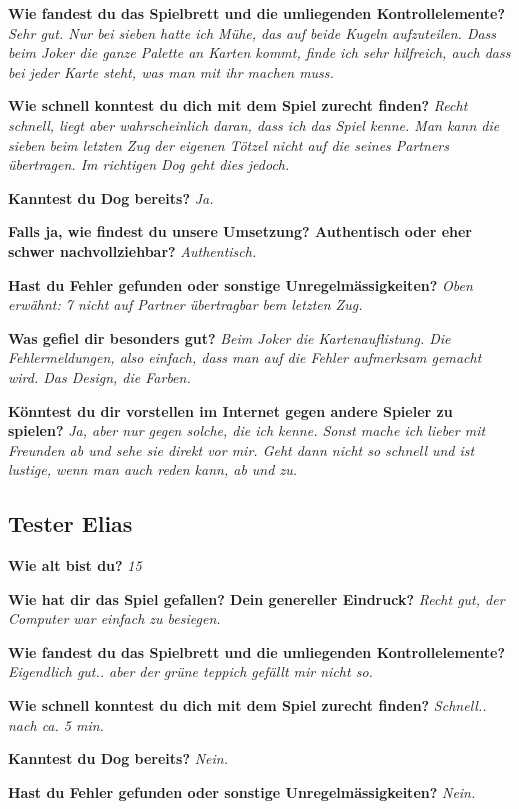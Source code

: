 \documentclass[12pt,halfparskip]{scrartcl}
\begin{document}
\textbf{Wie fandest du das Spielbrett und die umliegenden Kontrollelemente?}
\emph{Sehr gut. Nur bei sieben hatte ich Mühe, das auf beide Kugeln aufzuteilen. Dass beim Joker die ganze Palette an Karten kommt, finde ich sehr hilfreich, auch dass bei jeder Karte steht, was man mit ihr machen muss.}

\textbf{Wie schnell konntest du dich mit dem Spiel zurecht finden?}
\emph{Recht schnell, liegt aber wahrscheinlich daran, dass ich das Spiel kenne. Man kann die sieben beim letzten Zug der eigenen Tötzel nicht auf die seines Partners übertragen. Im richtigen Dog geht dies jedoch.}

\textbf{Kanntest du Dog bereits?}
\emph{Ja.}

\textbf{Falls ja, wie findest du unsere Umsetzung? Authentisch oder eher schwer nachvollziehbar?}
\emph{Authentisch.}

\textbf{Hast du Fehler gefunden oder sonstige Unregelmässigkeiten?}
\emph{Oben erwähnt: 7 nicht auf Partner übertragbar bem letzten Zug.}

\textbf{Was gefiel dir besonders gut?}
\emph{Beim Joker die Kartenauflistung. Die Fehlermeldungen, also einfach, dass man auf die Fehler aufmerksam gemacht wird. Das Design, die Farben.}

\textbf{Könntest du dir vorstellen im Internet gegen andere Spieler zu spielen?}
\emph{Ja, aber nur gegen solche, die ich kenne. Sonst mache ich lieber mit Freunden ab und sehe sie direkt vor mir. Geht dann nicht so schnell und ist lustige, wenn man auch reden kann, ab und zu.}

\subsection{Tester Elias}
\textbf{Wie alt bist du?}
\emph{15}

\textbf{Wie hat dir das Spiel gefallen? Dein genereller Eindruck?}
\emph{Recht gut, der Computer war einfach zu besiegen.}

\textbf{Wie fandest du das Spielbrett und die umliegenden Kontrollelemente?}
\emph{Eigendlich gut.. aber der grüne teppich gefällt mir nicht so.}

\textbf{Wie schnell konntest du dich mit dem Spiel zurecht finden?}
\emph{Schnell.. nach ca. 5 min.}

\textbf{Kanntest du Dog bereits?}
\emph{Nein.}

\textbf{Hast du Fehler gefunden oder sonstige Unregelmässigkeiten?}
\emph{Nein.}
\end{document}
